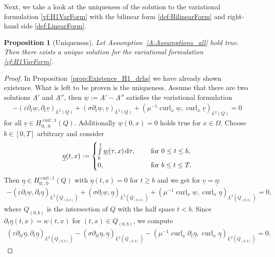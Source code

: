 \documentclass[a4paper,11pt]{article}
\newtheorem{prop}{Proposition}
\newcommand{\cu}{\operatorname{curl}}
\renewcommand{\vec}[1]{\underline{#1}}
\begin{document}
Next, we take a look at the uniqueness of  the solution to the variational formulation \eqref{vf:H1VarForm} with the bilinear form \eqref{def:BilinearForm} and right-hand side \eqref{def:LinearForm}.
\begin{prop}[Uniqueness]\label{prop:Uniqueness_H1_drhs}
	Let Assumption~\ref{A:Assumptions_all} hold true. Then there exists a unique solution for the variational formulation \eqref{vf:H1VarForm}.
\end{prop}
\begin{proof}
	In Proposition~\ref{prop:Existence_H1_drhs} we have already shown existence. What is left to be proven is the uniqueness.
	Assume that there are two solutions $\vec A'$ and $\vec A''$, then $\vec w:= \vec A'-\vec A''$ satisfies the variational formulation
	\begin{align*}
		- (\varepsilon\partial_t \vec w ,\partial_t \vec v)_{L^2(Q)}+( \sigma\partial_t \vec w , \vec v)_{L^2(Q)}+ ( \mu^{-1}	\cu_x \vec w, \cu_x \vec v)_{L^2(Q)} = 0 
	\end{align*}
	for all $\vec v\in H^{\cu;1}_{0;,0}(Q) $. Additionally $\vec w(0,x) = 0$ holds true for $x\in \Omega$. Choose  $b\in [0,T]$ arbitrary and consider
	\begin{align*}
		\vec \eta(t,x) := \begin{cases}	
			\int\limits_b^t\vec w(\tau,x)\,\mathrm d\tau, \hspace*{.3cm}&\textmd{ for } 0\leq t\leq b,\\
			0, \hspace*{2cm}&\textmd{ for } b\leq t\leq T.
		\end{cases}
	\end{align*}
	Then $\vec \eta\in H^{\cu;1}_{0;,0}(Q)$ with  $\vec \eta(t,x) = 0$ for $t\geq b$ and we get for $\vec v=\vec \eta$:
	\begin{align*}
		- (\varepsilon\partial_t \vec w,\partial_t \vec \eta)_{L^2(Q_{(0,b)})}+(\sigma\partial_t \vec w, \vec \eta)_{L^2(Q_{(0,b)})}+  (\mu^{-1}	\cu_x \vec  w, \cu_x\vec  \eta)_{L^2(Q_{(0,b)})} = 0, 
	\end{align*}
	where $Q_{(0,b)}$ is the intersection of $Q$ with the half space $t< b$. Since $\partial_t \vec \eta (t,x)= w(t,x) $	for $(t,x)\in {Q_{(0,b)}}$, we compute
	\begin{align*}
		(\varepsilon\partial_{tt}\vec \eta, \partial_t\vec \eta)_{L^2(Q_{(0,b)})} - (\sigma\partial_{tt}\vec \eta,\vec \eta)_{L^2(Q_{(0,b)})} - (\mu^{-1}	\cu_x \partial_t \vec \eta,\cu_x \vec \eta)_{L^2(Q_{(0,b)})} = 0.
	\end{align*}

\end{proof}
\end{document}
